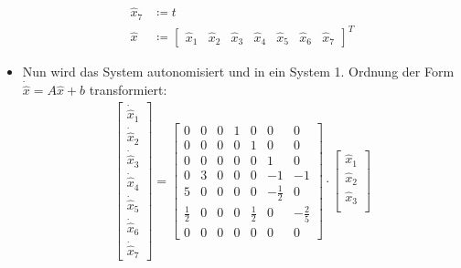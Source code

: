 \documentclass[a4paper, 11pt, accentcolor = tud3b]{tudreport}
\begin{document}
\begin{itemize}
\begin{align*}
					            \hat{x} _ 7 &\coloneqq t \tag{Autonomisierung} \\
					            \hat{x}     &\coloneqq
						            \begin{bmatrix}
							            \hat{x} _ 1 & \hat{x} _ 2 & \hat{x} _ 3 & \hat{x} _ 4 & \hat{x} _ 5 & \hat{x} _ 6 & \hat{x} _ 7
						            \end{bmatrix} ^ T
				            \end{align*}
				        \item Nun wird das System autonomisiert und in ein System 1. Ordnung der Form \( \dot{\hat{x}} = A \hat{x} + b \) transformiert:
					        \begin{align*}
						        \begin{bmatrix}
							        \dot{\hat{x}} _ 1 \\
							        \dot{\hat{x}} _ 2 \\
							        \dot{\hat{x}} _ 3 \\
							        \dot{\hat{x}} _ 4 \\
							        \dot{\hat{x}} _ 5 \\
							        \dot{\hat{x}} _ 6 \\
							        \dot{\hat{x}} _ 7
						        \end{bmatrix}
						        =
						        \begin{bmatrix}
						        	0           & 0 & 0 & 1 & 0           & 0            & 0            \\
						        	0           & 0 & 0 & 0 & 1           & 0            & 0            \\
						        	0           & 0 & 0 & 0 & 0           & 1            & 0            \\
						        	0           & 3 & 0 & 0 & 0           & -1           & -1           \\
						        	5           & 0 & 0 & 0 & 0           & -\frac{1}{2} & 0            \\
						        	\frac{1}{2} & 0 & 0 & 0 & \frac{1}{2} & 0            & -\frac{2}{5} \\
						        	0           & 0 & 0 & 0 & 0           & 0            & 0
						        \end{bmatrix}
						        \cdot
						        \begin{bmatrix}
							        \hat{x} _ 1 \\
							        \hat{x} _ 2 \\
							        \hat{x} _ 3 \\

\end{bmatrix}
\end{align*}
\end{itemize}
\end{document}
